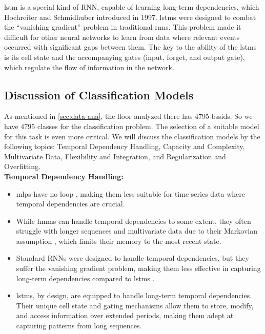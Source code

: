 \ac{lstm} is a special kind of RNN, capable of learning long-term dependencies, which Hochreiter and Schmidhuber introduced in 1997\cite{lstm-hochreiter}.
\acp{lstm} were designed to combat the ``vanishing gradient'' problem in traditional \acp{rnn}. 
This problem made it difficult for other neural networks to learn from data where relevant events occurred with significant gaps between them.
The key to the ability of the \acp{lstm} is its cell state and the accompanying gates (input, forget, and output gate), which regulate the flow of information in the network.



\subsection{Discussion of Classification Models}
As mentioned in \cref{sec:data-ana}, the floor analyzed there has 4795 \acp{bssid}.
So we have 4795 classes for the classification problem.
The selection of a suitable model for this task is even more critical.
We will discuss the classification models by the following topics: Temporal Dependency Handling, Capacity and Complexity, Multivariate Data, Flexibility and Integration, and Regularization and Overfitting. \\

\textbf{Temporal Dependency Handling:}
\begin{itemize}
    \item \acp{mlp} have no loop \cite{mlp_and_nn}, making them less suitable for time series data where temporal dependencies are crucial.
    \item While \acp{hmm} can handle temporal dependencies to some extent, they often struggle with longer sequences and multivariate data due to their Markovian assumption \cite{hmm-rabiner-1989}, which limits their memory to the most recent state.
    \item Standard RNNs were designed to handle temporal dependencies, but they suffer the vanishing gradient problem, making them less effective in capturing long-term dependencies compared to \acp{lstm} \cite{rnn_difficulties_2013}.
    \item \acp{lstm}, by design, are equipped to handle long-term temporal dependencies. Their unique cell state and gating mechanisms allow them to store, modify, and access information over extended periods, making them adept at capturing patterns from long sequences. \cite{lstm-hochreiter}
\end{itemize}

